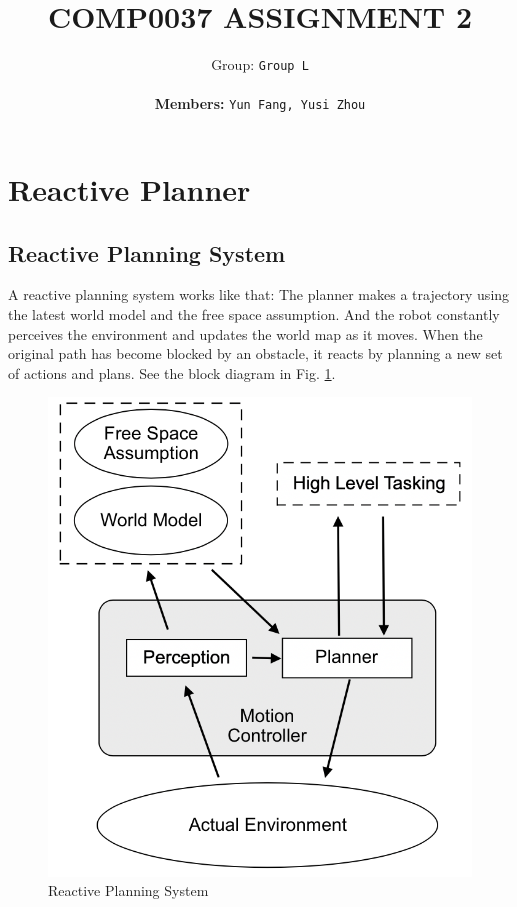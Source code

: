 \documentclass{article}
\title{COMP0037 ASSIGNMENT 2}
\author{
 Group: \texttt{Group L}\\\\
 \textbf{Members:} \texttt{Yun Fang, Yusi Zhou}
}
\begin{document}
\maketitle


\section{Reactive Planner}
\subsection {Reactive Planning System}

A reactive planning system works like that: The planner makes a trajectory using the latest world model and the free space assumption. And the robot constantly perceives the environment and updates the world map as it moves. When the original path has become blocked by an obstacle, it reacts by planning a new set of actions and plans. See the block diagram in Fig. \ref {fig:reactivePlanningSystem}.

\begin{figure}[ht]
\centering
\includegraphics[scale=0.5]{graphs/part1/reactivePlanningSystem.PNG}
\caption{Reactive Planning System}
\label{fig:reactivePlanningSystem}
\end{figure}
\end{document}
